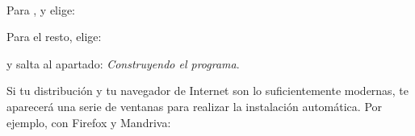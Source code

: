 \ \ \ 

Para ,
 y
 elige:


Para el resto, elige: 


y salta al apartado: \textit{Construyendo el programa}. 


\bigskip


\bigskip

Si tu distribución y tu navegador de Internet son lo suficientemente
modernas, te aparecerá una serie de ventanas para realizar la
instalación automática. Por ejemplo, con Firefox y Mandriva:



